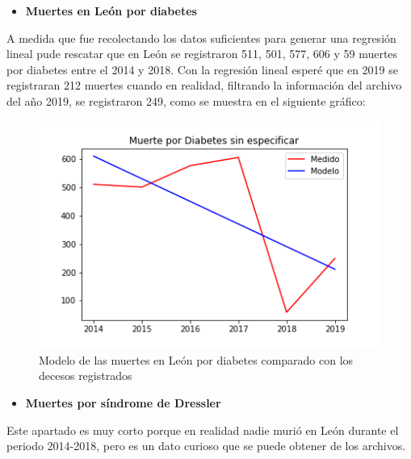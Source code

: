 \documentclass[12pt,letterpaper]{article}
\begin{document}
\begin{itemize}
    \item \textbf{Muertes en León por diabetes}
\end{itemize}
A medida que fue recolectando los datos suficientes para generar una regresión lineal pude rescatar que en León se registraron 511, 501, 577, 606 y 59 muertes por diabetes entre el 2014 y 2018. Con la regresión lineal esperé que en 2019 se registraran 212 muertes cuando en realidad, filtrando la información del archivo del año 2019, se registraron 249, como se muestra en el siguiente gráfico:
\begin{figure}[H]
    \centering
    \includegraphics[scale=0.6]{Diabetes.png}
    \caption{Modelo de las muertes en León por diabetes comparado con los decesos registrados}
    \label{fig:my_label}
\end{figure}
\begin{itemize}
    \item \textbf{Muertes por síndrome de Dressler}
\end{itemize}
Este apartado es muy corto porque en realidad nadie murió en León durante el periodo 2014-2018, pero es un dato curioso que se puede obtener de los archivos. \\

\printbibliography
\end{document}
